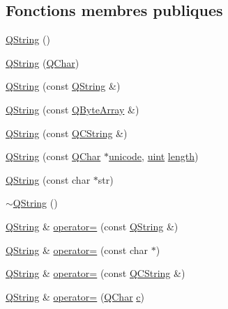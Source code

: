 \subsection*{Fonctions membres publiques}
\begin{DoxyCompactItemize}
\item 
\hyperlink{class_q_string_ac17675a27c6e32a31e04f07a5308a9cb}{Q\+String} ()
\item 
\hyperlink{class_q_string_aca2e82d8b16be0e3c61ede2c1f5a83b2}{Q\+String} (\hyperlink{class_q_char}{Q\+Char})
\item 
\hyperlink{class_q_string_ae6ff6f22247f503dbd0d49ecae567527}{Q\+String} (const \hyperlink{class_q_string}{Q\+String} \&)
\item 
\hyperlink{class_q_string_a247768790b0c679fde77b0b1bf511581}{Q\+String} (const \hyperlink{qcstring_8h_ad6a390648110655c217fe072d45fbcf5}{Q\+Byte\+Array} \&)
\item 
\hyperlink{class_q_string_abc4fc66157abf50671aeaf47d4ceacc9}{Q\+String} (const \hyperlink{class_q_c_string}{Q\+C\+String} \&)
\item 
\hyperlink{class_q_string_a1c92cd2bae630f25ed8516a7bc8c8258}{Q\+String} (const \hyperlink{class_q_char}{Q\+Char} $\ast$\hyperlink{class_q_string_a90243c19cde0be976d0f498db7f7e53a}{unicode}, \hyperlink{qglobal_8h_a4d3943ddea65db7163a58e6c7e8df95a}{uint} \hyperlink{class_q_string_a131b10981e8c68c2d291934c140be464}{length})
\item 
\hyperlink{class_q_string_ac86c64fc0edc5d4c7347180dfa51e1d0}{Q\+String} (const char $\ast$str)
\item 
\hyperlink{class_q_string_afa89b9f5bbd0f59d390ddfae4972c34e}{$\sim$\+Q\+String} ()
\item 
\hyperlink{class_q_string}{Q\+String} \& \hyperlink{class_q_string_ac5c900af262dc166252f0866b6fa8d0e}{operator=} (const \hyperlink{class_q_string}{Q\+String} \&)
\item 
\hyperlink{class_q_string}{Q\+String} \& \hyperlink{class_q_string_a16f43f6efe6e1bf2d089d1915429b415}{operator=} (const char $\ast$)
\item 
\hyperlink{class_q_string}{Q\+String} \& \hyperlink{class_q_string_ad15235dbb2ee65e25be1104f88ee348d}{operator=} (const \hyperlink{class_q_c_string}{Q\+C\+String} \&)
\item 
\hyperlink{class_q_string}{Q\+String} \& \hyperlink{class_q_string_a69c0fc9ce4fc282c90c76bdf1af8ce55}{operator=} (\hyperlink{class_q_char}{Q\+Char} \hyperlink{060__command__switch_8tcl_ab14f56bc3bd7680490ece4ad7815465f}{c})

\end{DoxyCompactItemize}

